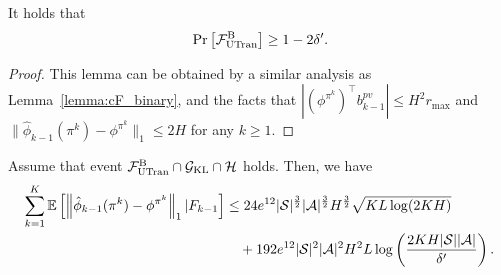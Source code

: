 \begin{lemma}
	It holds that
	\begin{align*}
		\Pr \left[  \mathcal{F}^{\textup{B}}_{\textup{UTran}}  \right] \geq 1-2\delta' .
	\end{align*}
\end{lemma}
\begin{proof}
	This lemma can be obtained by a similar analysis as  Lemma~\ref{lemma:cF_binary}, and the facts that  $|(\phi^{\pi^k})^\top b^{pv}_{k-1}| \leq H^2 r_{\max}$ and $ \| \hat{\phi}_{k-1}(\pi^k) - \phi^{\pi^k} \|_1  \leq 2H$ for any $k\geq1$.
\end{proof}

\begin{lemma} \label{lemma:phi_hat-phi_l1}
	Assume that event $\mathcal{F}^{\textup{B}}_{\textup{UTran}} \cap \mathcal{G}_{\textup{KL}} \cap \mathcal{H}$ holds. Then, we have
	\begin{align*}
		\sum_{k=1}^{K} \mathbb{E}\left[  \left\|  \hat{\phi}_{k-1}(\pi^k) - \phi^{\pi^k}  \right\|_1 | F_{k-1}  \right] &\leq 24 e^{12} |\mathcal{S}|^{\frac{3}{2}} |\mathcal{A}|^{\frac{3}{2}} H^{\frac{3}{2}}  \sqrt{ KL\log(2KH) } 
		\\
		&\quad + 192 e^{12} |\mathcal{S}|^2 |\mathcal{A}|^2 H^2L \log\left( \frac{2KH|\mathcal{S}||\mathcal{A}|}{\delta'} \right)  .
	\end{align*}
\end{lemma}
